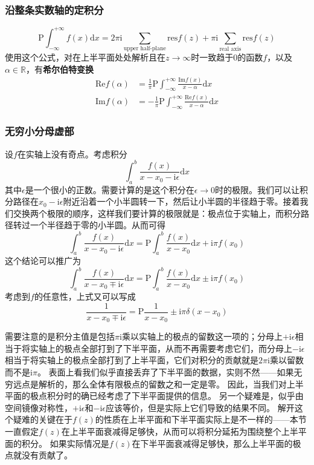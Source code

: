 \documentclass[UTF8]{ctexart}
\newcommand*{\reals}{\mathbb{R}}
\begin{document}
\hypertarget{ux6cbfux6574ux6761ux5b9eux6570ux8f74ux7684ux5b9aux79efux5206}{%
\subsubsection{沿整条实数轴的定积分}\label{ux6cbfux6574ux6761ux5b9eux6570ux8f74ux7684ux5b9aux79efux5206}}

\[
\mathrm{P} \int_{-\infty}^{+\infty} f(x) \mathrm{d}x = 2 \pi  \mathrm{i} \sum_{\text{upper half-plane}} \mathrm{res} f(z) + \pi \mathrm{i} \sum_{\text{real axis}} \mathrm{res} f(z)
\]
使用这个公式，对在上半平面处处解析且在$z \to \infty$时一致趋于0的函数$f$，以及$\alpha \in \reals$，有\textbf{希尔伯特变换}
\[
\begin{aligned}
    \mathrm{Re} f(\alpha) &= \frac{1}{\pi} \mathrm{P} \int_{-\infty}^{+\infty} \frac{\mathrm{Im} f(x)}{x - \alpha} \mathrm{d} x \\
    \mathrm{Im} f(\alpha) &= - \frac{1}{\pi} \mathrm{P} \int_{-\infty}^{+\infty} \frac{\mathrm{Re} f(x)}{x - \alpha} \mathrm{d} x 
\end{aligned}
\]

\hypertarget{ux65e0ux7a77ux5c0fux5206ux6bcdux865aux90e8}{%
\subsubsection{无穷小分母虚部}\label{ux65e0ux7a77ux5c0fux5206ux6bcdux865aux90e8}}

设$f$在实轴上没有奇点。考虑积分 \[
\int_a^b \frac{f(x)}{x-x_0 - \mathrm{i}\epsilon} \mathrm{d}x
\]
其中$\epsilon$是一个很小的正数。需要计算的是这个积分在$\epsilon\to 0$时的极限。我们可以让积分路径在$x_0 - \mathrm{i}\epsilon$附近沿着一个小半圆转一下，然后让小半圆的半径趋于零。接着我们交换两个极限的顺序，这样我们要计算的极限就是：极点位于实轴上，而积分路径转过一个半径趋于零的小半圆。从而可得
\[
\int_a^b \frac{f(x)}{x-x_0 - \mathrm{i}\epsilon} \mathrm{d}x = \mathrm{P} \int_a^b \frac{f(x)}{x-x_0} \mathrm{d}x + \mathrm{i} \pi f(x_0)
\] 这个结论可以推广为 \[
\int_a^b \frac{f(x)}{x-x_0 \mp \mathrm{i}\epsilon} \mathrm{d}x = \mathrm{P} \int_a^b \frac{f(x)}{x-x_0} \mathrm{d}x \pm \mathrm{i} \pi f(x_0)
\] 考虑到$f$的任意性，上式又可以写成 \[
\frac{1}{x - x_0 \mp \mathrm{i}\epsilon} = \mathrm{P} \frac{1}{x - x_0} \pm \mathrm{i} \pi \delta(x - x_0)
\]

需要注意的是积分主值是包括$\pi \mathrm{i}$乘以实轴上的极点的留数这一项的；分母上$+\mathrm{i} \epsilon$相当于将实轴上的极点全部打到了下半平面，从而不再需要考虑它们，而分母上$- \mathrm{i} \epsilon$相当于将实轴上的极点全部打到了上半平面，它们对积分的贡献就是$2\pi \mathrm{i}$乘以留数而不是$\mathrm{i} \pi$。
表面上看我们似乎直接丢弃了下半平面的数据，实则不然——如果无穷远点是解析的，那么全体有限极点的留数之和一定是零。
因此，当我们对上半平面的极点积分时的确已经考虑了下半平面提供的信息。
另一个疑难是，似乎由空间镜像对称性，$+ \mathrm{i} \epsilon$和$- \mathrm{i} \epsilon$应该等价，但是实际上它们导致的结果不同。
解开这个疑难的关键在于$f(z)$的性质在上半平面和下半平面实际上是不一样的——本节一直假定$f(z)$在上半平面衰减得足够快，从而可以将积分延拓为围绕整个上半平面的积分。
如果实际情况是$f(z)$在下半平面衰减得足够快，那么上半平面的极点就没有贡献了。
\end{document}
